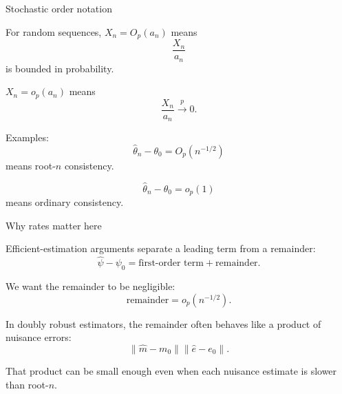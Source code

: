 \documentclass[xcolor={table}, handout]{beamer}
\begin{document}
\note{
\scriptsize \singlespacing

}
\begin{frame}{Stochastic order notation}

\begin{wideitemize}
\item For random sequences, $X_n=O_p(a_n)$ means
\[
\frac{X_n}{a_n}
\]
is bounded in probability.\pause
\item $X_n=o_p(a_n)$ means
\[
\frac{X_n}{a_n}\overset{p}{\rightarrow}0.
\]\pause
\item Examples:
\[
\hat\theta_n-\theta_0=O_p(n^{-1/2})
\]
means root-$n$ consistency.\pause
\item
\[
\hat\theta_n-\theta_0=o_p(1)
\]
means ordinary consistency.
\end{wideitemize}

\end{frame}

\note{
\scriptsize \singlespacing

}
\begin{frame}{Why rates matter here}

\begin{wideitemize}
\item Efficient-estimation arguments separate a leading term from a remainder:
\[
\hat\psi-\psi_0
  =
  \text{first-order term}
  +
  \text{remainder}.
\]\pause
\item We want the remainder to be negligible:
\[
\text{remainder}=o_p(n^{-1/2}).
\]\pause
\item In doubly robust estimators, the remainder often behaves like a product of nuisance errors:
\[
\|\hat m-m_0\|\|\hat e-e_0\|.
\]\pause
\item That product can be small enough even when each nuisance estimate is slower than root-$n$.
\end{wideitemize}

\end{frame}
\end{document}
